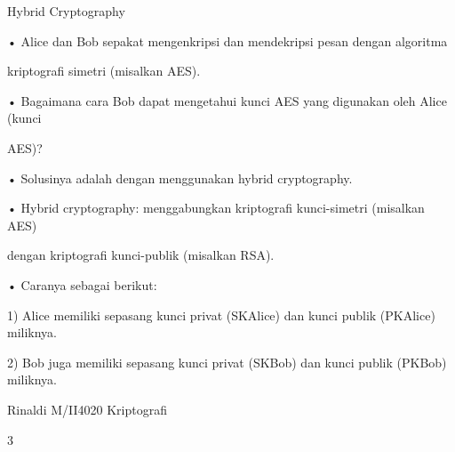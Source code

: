 \documentclass{article}
\begin{document}

Hybrid Cryptography

• Alice dan Bob sepakat mengenkripsi dan mendekripsi pesan dengan algoritma 

kriptografi simetri (misalkan AES). 

• Bagaimana cara Bob dapat mengetahui kunci AES yang digunakan oleh Alice (kunci 

AES)?

• Solusinya adalah dengan menggunakan hybrid cryptography.

• Hybrid cryptography: menggabungkan kriptografi kunci-simetri (misalkan AES) 

dengan kriptografi kunci-publik (misalkan RSA).

• Caranya sebagai berikut:

    1) Alice memiliki sepasang kunci privat (SKAlice) dan kunci publik (PKAlice) miliknya. 

    2) Bob juga memiliki sepasang kunci privat (SKBob) dan kunci publik (PKBob) miliknya.

Rinaldi M/II4020 Kriptografi

3
\end{document}
